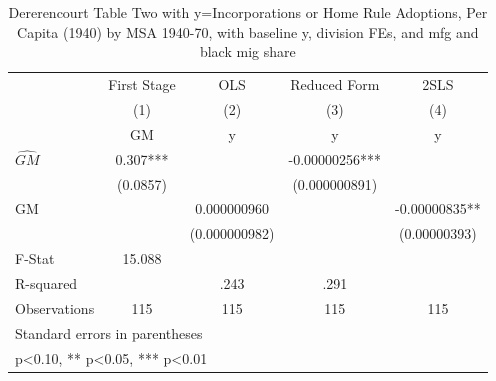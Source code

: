 \begin{table}[htbp]\centering
\def\sym#1{\ifmmode^{#1}\else\(^{#1}\)\fi}
\caption{Dererencourt Table Two with y=Incorporations or Home Rule Adoptions, Per Capita (1940) by MSA 1940-70, with baseline y, division FEs, and mfg and black mig share}
\begin{tabular}{l*{4}{c}}
\toprule
                    & First Stage   &         OLS   &Reduced Form   &        2SLS   \\
                    &\multicolumn{1}{c}{(1)}&\multicolumn{1}{c}{(2)}&\multicolumn{1}{c}{(3)}&\multicolumn{1}{c}{(4)}\\
                    &\multicolumn{1}{c}{GM}&\multicolumn{1}{c}{y}&\multicolumn{1}{c}{y}&\multicolumn{1}{c}{y}\\
\midrule
$\hat{GM}$          &       0.307***&               & -0.00000256***&               \\
                    &    (0.0857)   &               &(0.000000891)   &               \\
\addlinespace
GM                  &               & 0.000000960   &               & -0.00000835** \\
                    &               &(0.000000982)   &               &(0.00000393)   \\
\midrule
F-Stat              &      15.088   &               &               &               \\
R-squared           &               &        .243   &        .291   &               \\
Observations        &         115   &         115   &         115   &         115   \\
\bottomrule
\multicolumn{5}{l}{\footnotesize Standard errors in parentheses}\\
\multicolumn{5}{l}{\footnotesize * p<0.10, ** p<0.05, *** p<0.01}\\
\end{tabular}
\end{table}
